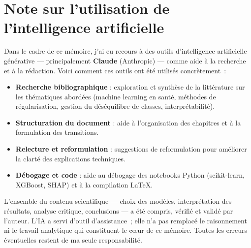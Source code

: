 
\section*{Note sur l'utilisation de l'intelligence artificielle}

Dans le cadre de ce mémoire, j'ai eu recours à des outils d'intelligence artificielle générative --- principalement \textbf{Claude} (Anthropic) --- comme aide à la recherche et à la rédaction. Voici comment ces outils ont été utilisés concrètement~:

\begin{itemize}
  \item \textbf{Recherche bibliographique} : exploration et synthèse de la littérature sur les thématiques abordées (machine learning en santé, méthodes de régularisation, gestion du déséquilibre de classes, interprétabilité).
  \item \textbf{Structuration du document} : aide à l'organisation des chapitres et à la formulation des transitions.
  \item \textbf{Relecture et reformulation} : suggestions de reformulation pour améliorer la clarté des explications techniques.
  \item \textbf{Débogage et code} : aide au débogage des notebooks Python (scikit-learn, XGBoost, SHAP) et à la compilation \LaTeX.
\end{itemize}

L'ensemble du contenu scientifique --- choix des modèles, interprétation des résultats, analyse critique, conclusions --- a été compris, vérifié et validé par l'auteur. L'IA a servi d'outil d'assistance~; elle n'a pas remplacé le raisonnement ni le travail analytique qui constituent le c\oe ur de ce mémoire. Toutes les erreurs éventuelles restent de ma seule responsabilité.

\bigskip
